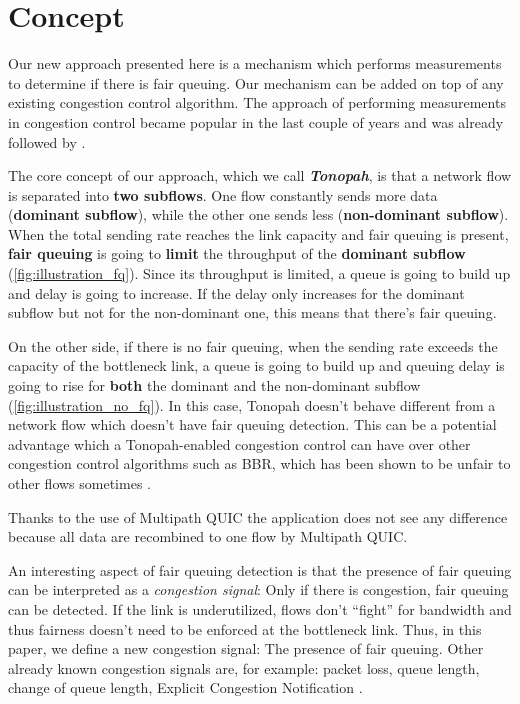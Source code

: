 \documentclass[conference]{IEEEtran}
\begin{document}
\section{Concept}

Our new approach presented here is a mechanism which performs measurements to determine if there is fair queuing. Our mechanism can be added on top of any existing congestion control algorithm. 
The approach of performing measurements in congestion control became popular in the last couple of years and was already followed by \cite{cardwell_bbr_2016,dong_pcc_2015,goyal_elasticity_2020,hayes_online_2020}.

The core concept of our approach, which we call \textbf{\textit{Tonopah}}, is that a network flow is separated into \textbf{two subflows}. 
One flow constantly sends more data (\textbf{dominant subflow}), while the other one sends less (\textbf{non-dominant subflow}). 
When the total sending rate reaches the link capacity and fair queuing is present, 
\textbf{fair queuing} is going to \textbf{limit} the throughput of the \textbf{dominant subflow} (\autoref{fig:illustration_fq}). 
Since its throughput is limited, a queue is going to build up and delay is going to increase. If the delay only increases for the dominant subflow but not for the non-dominant one, this means that there's fair queuing. 

On the other side, if there is no fair queuing, when the sending rate exceeds the capacity of the bottleneck link, a queue is going to build up and queuing delay is going to rise for \textbf{both} the dominant and the non-dominant subflow (\autoref{fig:illustration_no_fq}). 
In this case, Tonopah doesn't behave different from a network flow which doesn't have fair queuing detection. 
This can be a potential advantage which a Tonopah-enabled congestion control can have over other congestion control algorithms such as BBR, which has been shown to be unfair to other flows sometimes \cite{ware_modeling_2019,hock_experimental_2017}.

Thanks to the use of Multipath QUIC \cite{liu_multipath_2022} the application does not see any difference because all data are recombined to one flow by Multipath QUIC. 

An interesting aspect of fair queuing detection is that the presence of fair queuing can be interpreted as a \textit{congestion signal}: 
Only if there is congestion, fair queuing can be detected. If the link is underutilized, flows don't ``fight'' for bandwidth and thus fairness doesn't need to be enforced at the bottleneck link. 
Thus, in this paper, we define a new congestion signal: The presence of fair queuing. Other already known congestion signals are, for example: 
packet loss, queue length, change of queue length, Explicit Congestion Notification \cite{mathis_relentless_2009,hayes_revisiting_2011}. 
\end{document}
